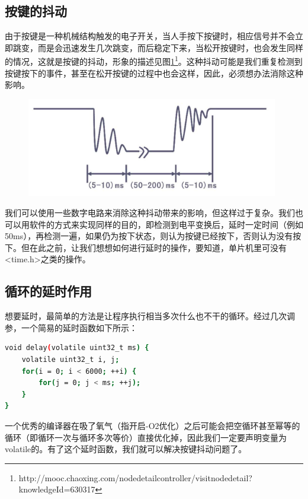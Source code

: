 	\subsection{按键的抖动}
		由于按键是一种机械结构触发的电子开关，当人手按下按键时，相应信号并不会立即跳变，而是会迅速发生几次跳变，而后稳定下来，当松开按键时，也会发生同样的情况，这就是按键的抖动，形象的描述见图\ref{fig:keyShake}\footnote{http://mooc.chaoxing.com/nodedetailcontroller/visitnodedetail?knowledgeId=630317}。这种抖动可能是我们重复检测到按键按下的事件，甚至在松开按键的过程中也会这样，因此，必须想办法消除这种影响。
		\begin{figure}[h]
			\begin{center}
				\includegraphics[width=110mm]{images/content/keyShake.jpg}
				\label{fig:keyShake}
			\end{center}
		\end{figure}
		\par 
		我们可以使用一些数字电路来消除这种抖动带来的影响，但这样过于复杂。我们也可以用软件的方式来实现同样的目的，即检测到电平变换后，延时一定时间（例如50ms），再检测一遍，如果仍为按下状态，则认为按键已经按下，否则认为没有按下。但在此之前，让我们想想如何进行延时的操作，要知道，单片机里可没有<time.h>之类的操作。
	
	\subsection{循环的延时作用}
	想要延时，最简单的方法是让程序执行相当多次什么也不干的循环。经过几次调参，一个简易的延时函数如下所示：
		\par 
		\begin{lstlisting}[language=bash, style=customStyleC, caption=简易延时函数]
void delay(volatile uint32_t ms) {
	volatile uint32_t i, j;
	for(i = 0; i < 6000; ++i) {
		for(j = 0; j < ms; ++j);
	}
}
		\end{lstlisting}
		\par 
		一个优秀的编译器在吸了氧气（指开启-O2优化）之后可能会把空循环甚至幂等的循环（即循环一次与循环多次等价）直接优化掉，因此我们一定要声明变量为volatile的。有了这个延时函数，我们就可以解决按键抖动问题了。
	
